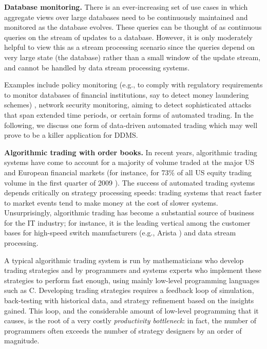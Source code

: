 \medskip


{\bf Database monitoring.}\/
There is an ever-increasing set of use cases in which aggregate views
over large databases need to be continuously maintained and monitored as
the database evolves. These queries can be thought of as continuous queries
on the stream of updates to a database. However, it is only moderately
helpful to view this as a stream processing scenario since the queries
depend on very large state (the database) rather than a small window of the
update stream, and cannot be handled by data stream processing systems.

Examples include policy monitoring (e.g., to comply with regulatory requirements to monitor databases of financial institutions,
say to detect money laundering schemes) \cite{BKM2010},
network security monitoring, aiming to detect sophisticated attacks
that span extended time periods, or certain forms of automated trading.
In the following, we discuss one form of data-driven automated trading which may well prove to
be a killer application for DDMS.


\medskip


{\bf Algorithmic trading with order books.}\/
In recent years, algorithmic trading systems have come to account for a majority
of volume traded at the major US and European financial markets (for instance,
for 73\% of all US equity trading volume in the first quarter of 2009
\cite{Iati2009}). The success of automated trading systems depends critically on
strategy processing speeds: trading systems that react faster to market events
tend to make money at the cost of slower systems. Unsurprisingly, algorithmic
trading has become a substantial source of business for the IT industry; for
instance, it is the leading vertical among the customer bases for high-speed
switch manufacturers (e.g., Arista \cite{Becht2010}) and data stream processing.




A typical algorithmic trading system is run by mathematicians who develop
trading strategies and by programmers and systems experts who implement these
strategies to perform fast enough, using mainly low-level programming languages
such as C. Developing trading strategies requires a feedback loop of simulation,
back-testing with historical data, and strategy refinement based on the insights
gained. This loop, and the considerable amount of low-level programming that it
causes, is the root of a very costly {\em productivity bottleneck}\/: in fact,
the number of programmers often exceeds the number of strategy designers by
an order of magnitude.


